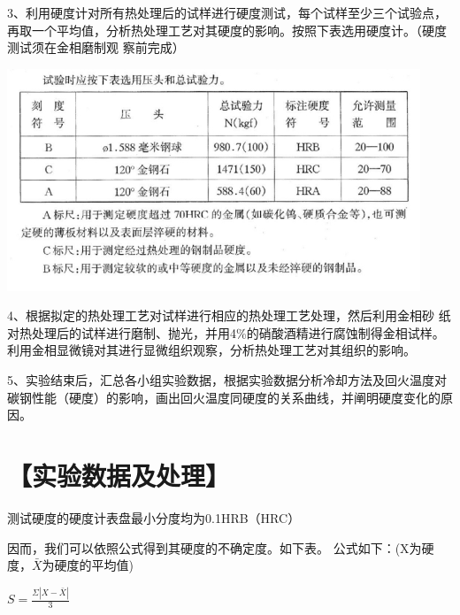 \documentclass[a4paper,utf8]{article}
\begin{document}
3、利用硬度计对所有热处理后的试样进行硬度测试，每个试样至少三个试验点，再取一个平均值，分析热处理工艺对其硬度的影响。按照下表选用硬度计。（硬度测试须在金相磨制观
察前完成）

\begin{center}
    \includegraphics[width=350pt]{4.png}
\end{center}


4、根据拟定的热处理工艺对试样进行相应的热处理工艺处理，然后利用金相砂
纸对热处理后的试样进行磨制、抛光，并用4\%的硝酸酒精进行腐蚀制得金相试样。
利用金相显微镜对其进行显微组织观察，分析热处理工艺对其组织的影响。

5、实验结束后，汇总各小组实验数据，根据实验数据分析冷却方法及回火温度对碳钢性能（硬度）的影响，画出回火温度同硬度的关系曲线，并阐明硬度变化的原因。
\section*{【实验数据及处理】}

测试硬度的硬度计表盘最小分度均为0.1HRB（HRC）

因而，我们可以依照公式得到其硬度的不确定度。如下表。
公式如下：(X为硬度，$\bar{X} $为硬度的平均值)
\begin{center}
    $ S = \frac{\Sigma |X - \bar{X}| }{3} $
\end{center}
\end{document}
